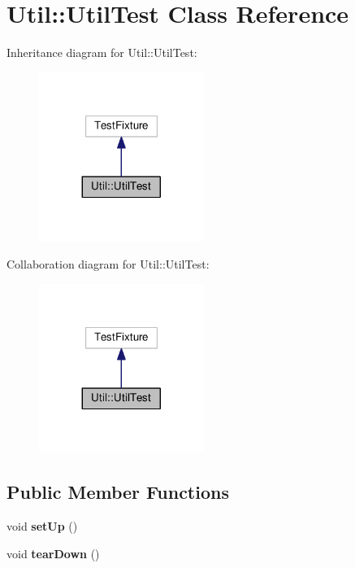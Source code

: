 \hypertarget{class_util_1_1_util_test}{}\section{Util\+:\+:Util\+Test Class Reference}
\label{class_util_1_1_util_test}


Inheritance diagram for Util\+:\+:Util\+Test\+:
\nopagebreak
\begin{figure}[H]
\begin{center}
\leavevmode
\includegraphics[width=152pt]{class_util_1_1_util_test__inherit__graph}
\end{center}
\end{figure}


Collaboration diagram for Util\+:\+:Util\+Test\+:
\nopagebreak
\begin{figure}[H]
\begin{center}
\leavevmode
\includegraphics[width=152pt]{class_util_1_1_util_test__coll__graph}
\end{center}
\end{figure}
\subsection*{Public Member Functions}
\begin{DoxyCompactItemize}
\item 
void {\bfseries set\+Up} ()\hypertarget{class_util_1_1_util_test_a10968ee4258f61df4caa1dbba822b9e6}{}\label{class_util_1_1_util_test_a10968ee4258f61df4caa1dbba822b9e6}

\item 
void {\bfseries tear\+Down} ()\hypertarget{class_util_1_1_util_test_a0b0e3dd728dc81fc516b35ed14f7ab7e}{}\label{class_util_1_1_util_test_a0b0e3dd728dc81fc516b35ed14f7ab7e}

\end{DoxyCompactItemize}
